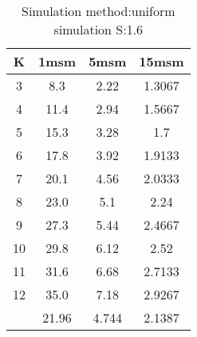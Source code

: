 \begin{table}[H]
\centering
\begin{tabular}{c|ccc}
K &1msm &5msm &15msm\\
\hline
3 & 8.3 & 2.22 & 1.3067\\
4 & 11.4 & 2.94 & 1.5667\\
5 & 15.3 & 3.28 & 1.7\\
6 & 17.8 & 3.92 & 1.9133\\
7 & 20.1 & 4.56 & 2.0333\\
8 & 23.0 & 5.1 & 2.24\\
9 & 27.3 & 5.44 & 2.4667\\
10 & 29.8 & 6.12 & 2.52\\
11 & 31.6 & 6.68 & 2.7133\\
12 & 35.0 & 7.18 & 2.9267\\
\hline
& 21.96 & 4.744 & 2.1387\\
\end{tabular}
\caption{Simulation method:uniform simulation S:1.6}
\label{tab:s1.6}
\end{table}
